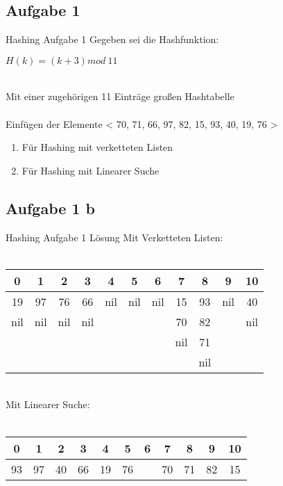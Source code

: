 	\subsection{Aufgabe 1}
	\begin{frame}{Hashing Aufgabe 1}
		Gegeben sei die Hashfunktion: \\
		\begin{center}
			$ H(k) = (k+3) mod \ 11$ 
		\end{center}
		\ \\
		Mit einer zugehörigen 11 Einträge großen Hashtabelle \\
		\ \\
		Einfügen der Elemente < 70, 71, 66, 97, 82, 15, 93, 40, 19, 76 >
		\\
		\begin{enumerate}
			\item Für Hashing mit verketteten Listen
			\item Für Hashing mit Linearer Suche
		\end{enumerate}

	\end{frame}

	\subsection{Aufgabe 1 b}	
	\begin{frame}{Hashing Aufgabe 1 Lösung}
		Mit Verketteten Listen:
		\ \\
		\ \\
		\begin{tabular*}{0.75\textwidth}{  c | c | c | c | c | c | c | c | c | c | c  }
			0 & 1 & 2 & 3 & 4 & 5 & 6 & 7 & 8 & 9 & 10 \\
			\hline
			19 & 97 & 76 & 66 & nil & nil & nil & 15 & 93 & nil & 40 \\
			 nil & nil & nil & nil &  &  &  & 70 & 82 &  & nil \\
			  &  &  &  &  &  &  & nil & 71 &  &  \\
 			  &  &  &  &  &  &  &  & nil &  &  \\


		\end{tabular*}
		\ \\
		\parskip 16pt
		Mit Linearer Suche:
		\ \\
		\ \\
		\begin{tabular*}{0.75\textwidth}{  c | c | c | c | c | c | c | c | c | c | c  }
			0 & 1 & 2 & 3 & 4 & 5 & 6 & 7 & 8 & 9 & 10 \\
			\hline
			93 & 97 & 40 & 66 & 19 & 76 &  & 70 & 71 & 82 & 15 \\			
		\end{tabular*}

	\end{frame}


